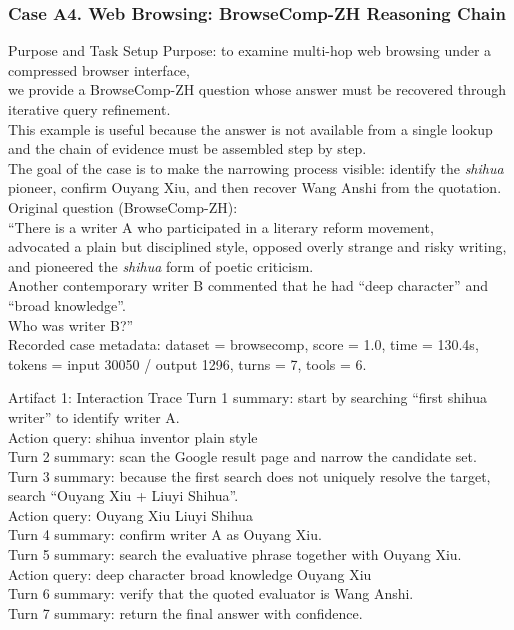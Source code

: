 \FloatBarrier

\subsubsection{Case A4. Web Browsing: BrowseComp-ZH Reasoning Chain}
\label{app:case_browsing}

\begin{CasePromptBox}{Purpose and Task Setup}
\small
Purpose: to examine multi-hop web browsing under a compressed browser interface, \\
we provide a BrowseComp-ZH question whose answer must be recovered through iterative query refinement. \\
This example is useful because the answer is not available from a single lookup and the chain of evidence must be assembled step by step. \\
The goal of the case is to make the narrowing process visible: identify the \emph{shihua} pioneer, confirm Ouyang Xiu, and then recover Wang Anshi from the quotation. \\
Original question (BrowseComp-ZH): \\
``There is a writer A who participated in a literary reform movement, \\
advocated a plain but disciplined style, opposed overly strange and risky writing, \\
and pioneered the \emph{shihua} form of poetic criticism. \\
Another contemporary writer B commented that he had ``deep character'' and ``broad knowledge''. \\
Who was writer B?'' \\
Recorded case metadata: dataset = browsecomp, score = 1.0, time = 130.4s, tokens = input 30050 / output 1296, turns = 7, tools = 6.
\end{CasePromptBox}

\begin{CaseTraceBox}{Artifact 1: Interaction Trace}
\small\ttfamily
Turn 1 summary: start by searching ``first shihua writer'' to identify writer A. \\
Action query: shihua inventor plain style \\
Turn 2 summary: scan the Google result page and narrow the candidate set. \\
Turn 3 summary: because the first search does not uniquely resolve the target, search ``Ouyang Xiu + Liuyi Shihua''. \\
Action query: Ouyang Xiu Liuyi Shihua \\
Turn 4 summary: confirm writer A as Ouyang Xiu. \\
Turn 5 summary: search the evaluative phrase together with Ouyang Xiu. \\
Action query: deep character broad knowledge Ouyang Xiu \\
Turn 6 summary: verify that the quoted evaluator is Wang Anshi. \\
Turn 7 summary: return the final answer with confidence.
\end{CaseTraceBox}

